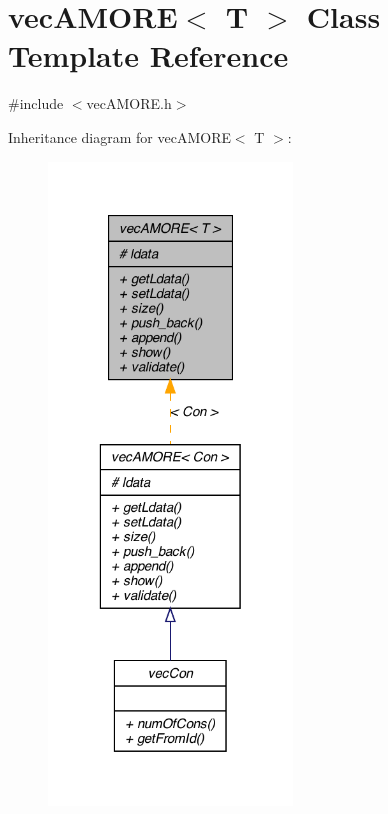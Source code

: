 \hypertarget{classvec_a_m_o_r_e}{
\section{vecAMORE$<$ T $>$ Class Template Reference}
\label{classvec_a_m_o_r_e}
}


{\ttfamily \#include $<$vecAMORE.h$>$}



Inheritance diagram for vecAMORE$<$ T $>$:\nopagebreak
\begin{figure}[H]
\begin{center}
\leavevmode
\includegraphics[width=184pt]{classvec_a_m_o_r_e__inherit__graph}
\end{center}
\end{figure}


